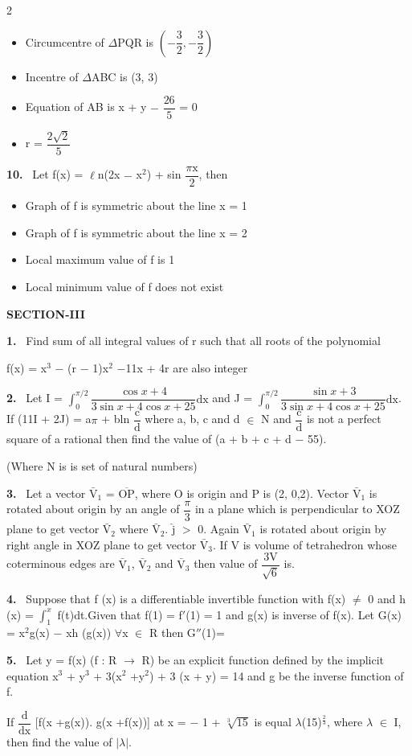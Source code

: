 \documentclass[10pt]{extarticle}
\newcommand{\sect}[1]{\par\smallskip\noindent\textbf{#1}\par}
\newcommand{\qn}[1]{\par\smallskip\noindent\textbf{#1.}~}
\newenvironment{qoptions}{\begin{itemize}[leftmargin=1.8em,itemsep=1pt,topsep=2pt,label={}]}{\end{itemize}}
\newcommand{\opt}[2]{\item[(#1)] #2}
\begin{document}
\begin{multicols}{2}
\begin{qoptions}
\opt{A}{Circumcentre of $\Delta$PQR is $\left(-\dfrac{3}{2}, -\dfrac{3}{2}\right)$}
\opt{B}{Incentre of $\Delta$ABC is (3, 3)}
\opt{C}{Equation of AB is x + y $-$ $\dfrac{26}{5}$ = 0}
\opt{D}{r = $\dfrac{2\sqrt{2}}{5}$}
\end{qoptions}
\qn{10} Let f(x) = $\ell$n(2x $-$ x$^2$) + sin $\dfrac{\pi\text{x}}{2}$, then
\begin{qoptions}
\opt{A}{Graph of f is symmetric about the line x = 1}
\opt{B}{Graph of f is symmetric about the line x = 2}
\opt{C}{Local maximum value of f is 1}
\opt{D}{Local minimum value of f does not exist}
\end{qoptions}
\sect{SECTION-III}
\qn{1} Find sum of all integral values of r such that all roots of the polynomial\par
f(x) = x$^3$ $-$ (r $-$ 1)x$^2$ $-$11x + 4r are also integer
\qn{2} Let I = $\displaystyle\int_0^{\pi/2}\dfrac{\cos x + 4}{3\sin x + 4\cos x + 25}\text{dx}$ and J = $\displaystyle\int_0^{\pi/2}\dfrac{\sin x + 3}{3\sin x + 4\cos x + 25}\text{dx}$. If (11I + 2J) = a$\pi$ + bln $\dfrac{\text{c}}{\text{d}}$ where a, b, c and d $\in$ N and $\dfrac{\text{c}}{\text{d}}$ is not a perfect square of a rational then find the value of (a + b + c + d $-$ 55).\par
(Where N is is set of natural numbers)
\qn{3} Let a vector $\bar{\text{V}}_1$ = $\overline{\text{OP}}$, where O is origin and P is (2, 0,2). Vector $\bar{\text{V}}_1$ is rotated about origin by an angle of $\dfrac{\pi}{3}$ in a plane which is perpendicular to XOZ plane to get vector $\bar{\text{V}}_2$ where $\bar{\text{V}}_2$. $\hat{\text{j}}$ $>$ 0. Again $\bar{\text{V}}_1$ is rotated about origin by right angle in XOZ plane to get vector $\bar{\text{V}}_3$. If V is volume of tetrahedron whose coterminous edges are $\bar{\text{V}}_1$, $\bar{\text{V}}_2$ and $\bar{\text{V}}_3$ then value of $\dfrac{3\text{V}}{\sqrt{6}}$ is.
\qn{4} Suppose that f (x) is a differentiable invertible function with f(x) $\neq$ 0 and h (x) = $\displaystyle\int_1^{x}$ f(t)dt.Given that f(1) = f$'$(1) = 1 and g(x) is inverse of f(x). Let G(x) = x$^2$g(x) $-$ xh (g(x)) $\forall$x $\in$ R then G$''$(1)=
\qn{5} Let y = f(x) (f : R $\longrightarrow$ R) be an explicit function defined by the implicit equation x$^3$ + y$^3$ + 3(x$^2$ +y$^2$) + 3 (x + y) = 14 and g be the inverse function of f.\par
If $\dfrac{\text{d}}{\text{dx}}$ [f(x +g(x)). g(x +f(x))] at x = $-$ 1 + $\sqrt[3]{15}$ is equal $\lambda$(15)$^{\frac{2}{3}}$, where $\lambda$ $\in$ I, then find the value of $|\lambda|$.

\end{multicols}
\end{document}
